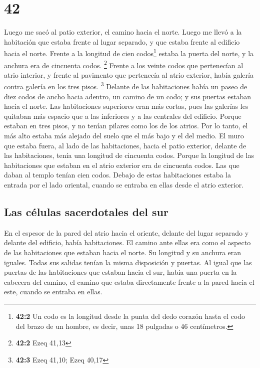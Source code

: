 \hypertarget{section-41}{%
\section{42}\label{section-41}}

 Luego me sacó al patio exterior, el camino hacia el
norte. Luego me llevó a la habitación que estaba frente al lugar
separado, y que estaba frente al edificio hacia el norte. 
Frente a la longitud de cien codos\footnote{\textbf{42:2} Un codo es la
  longitud desde la punta del dedo corazón hasta el codo del brazo de un
  hombre, es decir, unas 18 pulgadas o 46 centímetros.} estaba la puerta
del norte, y la anchura era de cincuenta codos. \footnote{\textbf{42:2}
  Ezeq 41,13}  Frente a los veinte codos que pertenecían
al atrio interior, y frente al pavimento que pertenecía al atrio
exterior, había galería contra galería en los tres pisos. \footnote{\textbf{42:3}
  Ezeq 41,10; Ezeq 40,17}  Delante de las habitaciones
había un paseo de diez codos de ancho hacia adentro, un camino de un
codo; y sus puertas estaban hacia el norte.  Las
habitaciones superiores eran más cortas, pues las galerías les quitaban
más espacio que a las inferiores y a las centrales del edificio.
 Porque estaban en tres pisos, y no tenían pilares como
los de los atrios. Por lo tanto, el más alto estaba más alejado del
suelo que el más bajo y el del medio.  El muro que estaba
fuera, al lado de las habitaciones, hacia el patio exterior, delante de
las habitaciones, tenía una longitud de cincuenta codos. 
Porque la longitud de las habitaciones que estaban en el atrio exterior
era de cincuenta codos. Las que daban al templo tenían cien codos.
 Debajo de estas habitaciones estaba la entrada por el
lado oriental, cuando se entraba en ellas desde el atrio exterior.

\hypertarget{las-cuxe9lulas-sacerdotales-del-sur}{%
\subsection{Las células sacerdotales del
sur}\label{las-cuxe9lulas-sacerdotales-del-sur}}

 En el espesor de la pared del atrio hacia el oriente,
delante del lugar separado y delante del edificio, había habitaciones.
 El camino ante ellas era como el aspecto de las
habitaciones que estaban hacia el norte. Su longitud y su anchura eran
iguales. Todas sus salidas tenían la misma disposición y puertas.
 Al igual que las puertas de las habitaciones que estaban
hacia el sur, había una puerta en la cabecera del camino, el camino que
estaba directamente frente a la pared hacia el este, cuando se entraba
en ellas.

